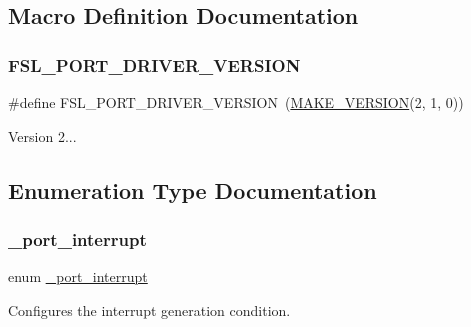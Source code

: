 \subsection{Macro Definition Documentation}
\mbox{\label{group__port_ga75a0a23a423adf79cd0f83a5fa2567a3}} 
\subsubsection{\texorpdfstring{FSL\_PORT\_DRIVER\_VERSION}{FSL\_PORT\_DRIVER\_VERSION}}
{\footnotesize\ttfamily \#define F\+S\+L\+\_\+\+P\+O\+R\+T\+\_\+\+D\+R\+I\+V\+E\+R\+\_\+\+V\+E\+R\+S\+I\+ON~(\mbox{\hyperlink{group__ftfx__utilities_ga812138aa3315b0c6953c1a26130bcc37}{M\+A\+K\+E\+\_\+\+V\+E\+R\+S\+I\+ON}}(2, 1, 0))}

Version 2... 

\subsection{Enumeration Type Documentation}
\mbox{\label{group__port_gafd69f8203c1c62d7c81088dc92423dce}} 
\subsubsection{\texorpdfstring{\_port\_interrupt}{\_port\_interrupt}}
{\footnotesize\ttfamily enum \mbox{\hyperlink{group__port_gafd69f8203c1c62d7c81088dc92423dce}{\+\_\+port\+\_\+interrupt}}}



Configures the interrupt generation condition. 

